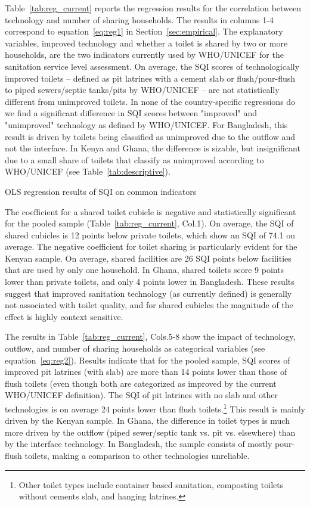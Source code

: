 \documentclass[natbib]{svjour3}                     %
\begin{document}
Table~\ref{tab:reg_current} reports the regression results for the correlation between technology and number of sharing households. The results in columns 1-4 correspond to equation~\ref{eq:reg1} in Section~\ref{sec:empirical}. The explanatory variables, improved technology and whether a toilet is shared by two or more households, are the two indicators currently used by WHO/UNICEF for the sanitation service level assessment. On average, the SQI scores of technologically improved toilets -- defined as pit latrines with a cement slab or flush/pour-flush to piped sewers/septic tanks/pits by WHO/UNICEF -- are not statistically different from unimproved toilets. In none of the country-specific regressions do we find a significant difference in SQI scores between "improved" and "unimproved" technology as defined by WHO/UNICEF. For Bangladesh, this result is driven by toilets being classified as unimproved due to the outflow and not the interface. In Kenya and Ghana, the difference is sizable, but insignificant due to a small share of toilets that classify as unimproved according to WHO/UNICEF (see Table~\ref{tab:descriptive}). 

\begin{table}
\caption{OLS regression results of SQI on common indicators}
\center
\resizebox{\textwidth}{!}{

}
\label{tab:reg_current}
\end{table}

The coefficient for a shared toilet cubicle is negative and statistically significant for the pooled sample (Table~\ref{tab:reg_current}, Col.1). On average, the SQI of shared cubicles is 12 points below private toilets, which show an SQI of 74.1 on average. The negative coefficient for toilet sharing is particularly evident for the Kenyan sample. On average, shared facilities are 26 SQI points below facilities that are used by only one household. In Ghana, shared toilets score 9 points lower than private toilets, and only 4 points lower in Bangladesh. These results suggest that improved sanitation technology (as currently defined) is generally not associated with toilet quality, and for shared cubicles the magnitude of the effect is highly context sensitive.

The results in Table~\ref{tab:reg_current}, Cols.5-8 show the impact of technology, outflow, and number of sharing households as categorical variables (see equation~\ref{eq:reg2}). Results indicate that for the pooled sample, SQI scores of improved pit latrines (with slab) are more than 14 points lower than those of flush toilets (even though both are categorized as improved by the current WHO/UNICEF definition). The SQI of pit latrines with no slab and other technologies is on average 24 points lower than flush toilets.\footnote{Other toilet types include container based sanitation, composting toilets without cements slab, and hanging latrines.} This result is mainly driven by the Kenyan sample. In Ghana, the difference in toilet types is much more driven by the outflow (piped sewer/septic tank vs. pit vs. elsewhere) than by the interface technology. In Bangladesh, the sample consists of mostly pour-flush toilets, making a comparison to other technologies unreliable. 
\end{document}
